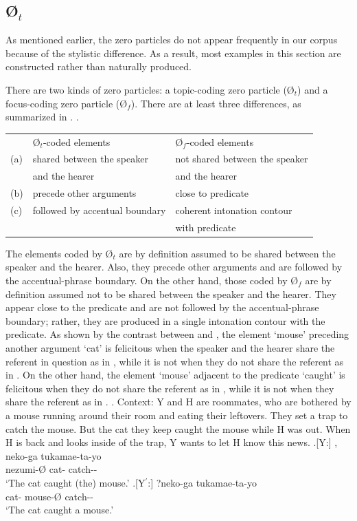 \subsection{{\O$_{t}$}}\label{TopZero}

As mentioned earlier,
the zero particles do not appear frequently in our corpus
because of the stylistic difference.
As a result,
most examples in this section are constructed rather than naturally produced.

There are two kinds of zero particles:
a topic-coding zero particle ({\O$_{t}$}) and a focus-coding zero particle ({\O$_{f}$}).
There are at least three differences, as summarized in \Next \cite[see also][]{niwa06,nakagawasato12}.
%
\ex.
\begin{tabular}{lll}
 & {\O$_{t}$}-coded elements & {\O$_{f}$}-coded elements \\
 (a) & shared between the speaker & not shared between the speaker \\
 & and the hearer & and the hearer \\
 (b) & precede other arguments & close to predicate \\
 (c) & followed by accentual boundary & coherent intonation contour\\
 &   &  with predicate \\
\end{tabular}

The elements coded by {\O$_{t}$} are by definition assumed to be shared between the speaker and the hearer.
Also, they precede other arguments and are followed by the accentual-phrase boundary.
On the other hand,
those coded by {\O$_{f}$} are by definition assumed not to be shared between the speaker and the hearer.
They appear close to the predicate and are not followed by the accentual-phrase boundary;
rather, they are produced in a single intonation contour with the predicate.
As shown by the contrast between \Next and \NNext,
the element  `mouse' preceding another argument  `cat' is felicitous when the speaker and the hearer share the referent in question as in \Next[Y],
while it is not when they do not share the referent as in \NNext[Y].
On the other hand,
the element `mouse' adjacent to the predicate  `caught' is felicitous when they do not share the referent as in \NNext[Y$^{\prime}$],
while it is not when they share the referent as in \Next[Y$^{\prime}$].
%
\ex. Context: Y and H are roommates,
	who are bothered by a mouse running around their room
	and eating their leftovers.
	They set a trap to catch the mouse.
	But the cat they keep caught the mouse while H was out.
	When H is back and looks inside of the trap,
	Y wants to let H know this news.
	\ag.[Y:] , neko-ga tukamae-ta-yo \\
		nezumi-{\O} cat- catch-- \\
		`The cat caught (the) mouse.'
	\bg.[Y$^{\prime}$:] ?neko-ga  tukamae-ta-yo \\
		cat- mouse-{\O} catch-- \\
		`The cat caught a mouse.'

